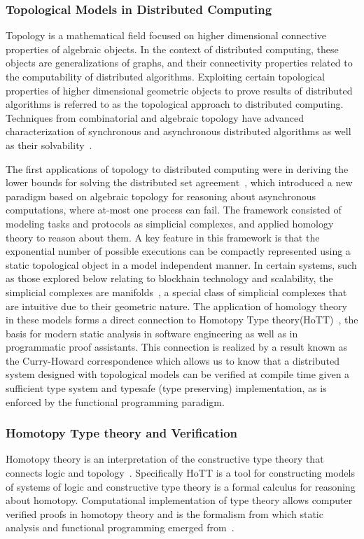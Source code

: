 \documentclass[runningheads]{llncs}
\begin{document}
\subsubsection{Topological Models in Distributed Computing}
Topology is a mathematical field focused on higher dimensional connective properties of algebraic objects. In the context of distributed computing, these objects are generalizations of graphs, and their connectivity properties related to the computability of distributed algorithms. Exploiting certain topological properties of higher dimensional geometric objects to prove results of distributed algorithms is referred to as the topological approach to distributed computing. Techniques from combinatorial and algebraic topology have advanced characterization of synchronous and asynchronous distributed algorithms as well as their solvability~\cite{ref_article1,ref_article2,ref_article3,ref_article4}. 

The first applications of topology to distributed computing were in deriving the lower bounds for solving the distributed set agreement~\cite{ref_article12}, which introduced a new paradigm based on algebraic topology for reasoning about asynchronous computations, where at-most one process can fail. The framework consisted of modeling tasks and protocols as simplicial complexes, and applied homology~\cite{ref_article5,ref_article9} theory to reason about them. A key feature in this framework is that the exponential number of possible executions can be compactly represented using a static topological object in a model independent manner. In certain systems, such as those explored below relating to blockhain technology and scalability, the simplicial complexes are manifolds~\cite{ref_article6,ref_article7,ref_article8}, a special class of simplicial complexes that are intuitive due to their geometric nature. The application of homology theory in these models forms a direct connection to Homotopy Type theory(HoTT)~\cite{ref_article9,ref_article10}, the basis for modern static analysis in software engineering as well as in programmatic proof assistants. This connection is realized by a result known as the Curry-Howard correspondence which allows us to know that a distributed system designed with topological models can be verified at compile time given a sufficient type system and typesafe (type preserving) implementation, as is enforced by the functional programming paradigm.

\subsubsection{Homotopy Type theory and Verification}
Homotopy theory is an interpretation of the constructive type theory that connects logic and topology~\cite{ref_book1}. Specifically HoTT is a tool for constructing models of systems of logic and constructive type theory is a formal calculus for reasoning about homotopy. Computational implementation of type theory allows computer verified proofs in homotopy theory and is the formalism from which static analysis and functional programming emerged from~\cite{ref_article10}.
\end{document}
